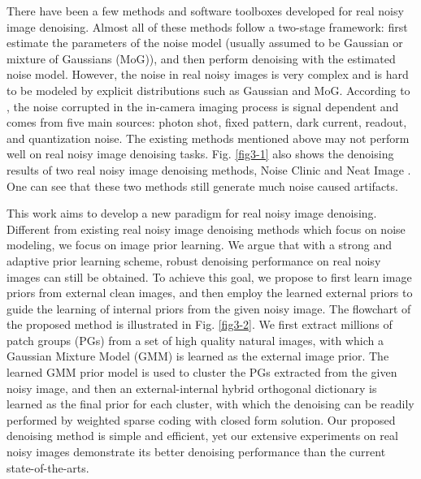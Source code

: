 There have been a few methods \cite{fullyblind,rabie2005robust,Liu2008,almapg,crosschannel2016,Zhu_2016_CVPR,noiseclinic,ncwebsite} and software toolboxes \cite{neatimage} developed for real noisy image denoising. Almost all of these methods follow a two-stage framework: first estimate the parameters of the noise model (usually assumed to be Gaussian or mixture of Gaussians (MoG)), and then perform denoising with the estimated noise model. However, the noise in real noisy images is very complex and is hard to be modeled by explicit distributions such as Gaussian and MoG. According to \cite{healey1994radiometric}, the noise corrupted in the in-camera imaging process \cite{tsin2001statistical,NewInCamera,crosschannel2016,karaimer_brown_ECCV_2016} is signal dependent and comes from five main sources: photon shot, fixed pattern, dark current, readout, and quantization noise. The existing methods \cite{fullyblind,rabie2005robust,Liu2008,almapg,crosschannel2016,Zhu_2016_CVPR,noiseclinic,
ncwebsite,neatimage} mentioned above may not perform well on real noisy image denoising tasks. Fig. \ref{fig3-1} also shows the denoising results of two real noisy image denoising methods, Noise Clinic \cite{noiseclinic,ncwebsite} and Neat Image \cite{neatimage}. One can see that these two methods still generate much noise caused artifacts. 

This work aims to develop a new paradigm for real noisy image denoising. Different from existing real noisy image denoising methods \cite{fullyblind,rabie2005robust,Liu2008,almapg,crosschannel2016,Zhu_2016_CVPR,noiseclinic,ncwebsite}  which focus on noise modeling, we focus on image prior learning. We argue that with a strong and adaptive prior learning scheme, robust denoising performance on real noisy images can still be obtained. To achieve this goal, we propose to first learn image priors from external clean images, and then employ the learned external priors to guide the learning of internal priors from the given noisy image. The flowchart of the proposed method is illustrated in Fig. \ref{fig3-2}. We first extract millions of patch groups (PGs) from a set of high quality natural images, with which a Gaussian Mixture Model (GMM) is learned as the external image prior. The learned GMM prior model is used to cluster the PGs extracted from the given noisy image, and then an external-internal hybrid orthogonal dictionary is learned as the final prior for each cluster, with which the denoising can be readily performed by weighted sparse coding with closed form solution. Our proposed denoising method is simple and efficient, yet our extensive experiments on real noisy images demonstrate its better denoising performance than the current state-of-the-arts.


